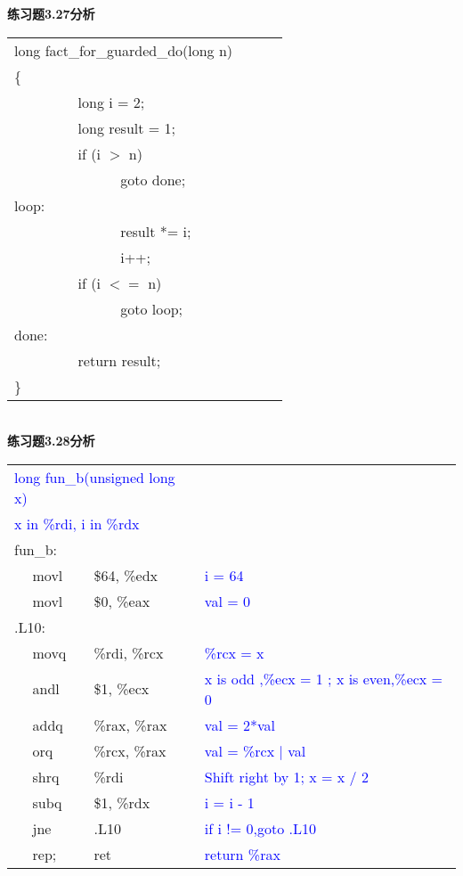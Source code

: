 \documentclass{article}
\newcommand{\blue}[1]{\textcolor{blue}{#1}}
\begin{document}
\begin{CJK}{UTF8}{gbsn}
\newpage
\noindent\textbf{练习题3.27分析}	\\[-3ex]
\begin{table}[ht]
\begin{tabular}{m{2em}m{2em}m{2em}l}
	\multicolumn{3}{l}{long fact\_for\_guarded\_do(long n)}	\\
\{	\\
	&	\multicolumn{3}{l}{long i = 2;}	\\
	&	\multicolumn{3}{l}{long result = 1;}	\\
	&	\multicolumn{3}{l}{ if (i $>$ n)  } 	\\
	&	&	\multicolumn{2}{l}{goto done;} 	\\
	\multicolumn{3}{l}{loop:} 	\\
	&	&	\multicolumn{2}{l}{result *= i;}	\\
	&	&	\multicolumn{2}{l}{i++;}	\\
	&	\multicolumn{3}{l}{if (i $<=$ n)}	\\
	&	&	\multicolumn{2}{l}{goto loop;} 	\\
	\multicolumn{3}{l}{done:} 	\\
	&	\multicolumn{3}{l}{return result;} 	\\
\}	\\
\end{tabular}
\end{table}	\\
\textbf{练习题3.28分析}	\\[-3ex]
\begin{table}[ht]
\begin{tabular}{m{2em}m{2em}m{8em}l}
	\multicolumn{3}{l}{\blue{ long fun\_b(unsigned long x) }}	\\
	\multicolumn{3}{l}{\blue{ x in \%rdi, i in \%rdx }}	\\
	\multicolumn{3}{l}{fun\_b:}	\\
	&	movl	&	\$64, \%edx 	&	\blue{i = 64}	\\
	&	movl	&	\$0, \%eax	&	\blue{val = 0}	\\
	\multicolumn{3}{l}{.L10:}	\\
	&	movq	&	\%rdi, \%rcx 	&	\blue{\%rcx = x}	\\
	&	andl	&	\$1, \%ecx 	&	\blue{x is odd ,\%ecx = 1 ; x is even,\%ecx = 0}	\\
	&	addq	&	\%rax, \%rax 	&	\blue{val = 2*val}	\\
	&	orq	&	\%rcx, \%rax 	&	\blue{val = \%rcx $|$ val}	\\
	&	shrq	&	\%rdi 	&	\blue{ Shift right by 1; x = x / 2 }	\\
	&	subq	&	\$1, \%rdx 	&	\blue{i = i - 1}	\\
	&	jne	&	.L10 	&	\blue{if i != 0,goto .L10}	\\
	&	rep;	&	ret 	&	\blue{return \%rax}	\\
\end{tabular}
\end{table}	\\


\end{CJK}
\end{document}
